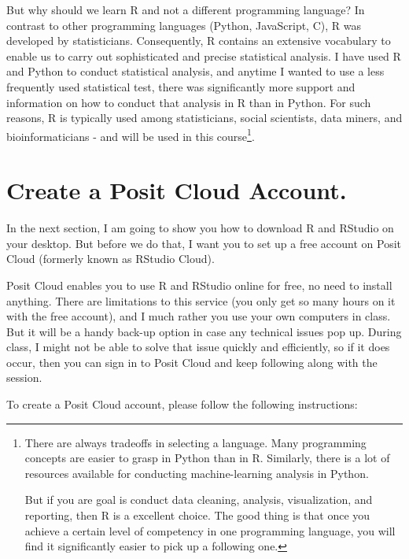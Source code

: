 \documentclass[
]{book}
\begin{document}
But why should we learn R and not a different programming language? In contrast to other programming languages (Python, JavaScript, C), R was developed by statisticians. Consequently, R contains an extensive vocabulary to enable us to carry out sophisticated and precise statistical analysis. I have used R and Python to conduct statistical analysis, and anytime I wanted to use a less frequently used statistical test, there was significantly more support and information on how to conduct that analysis in R than in Python. For such reasons, R is typically used among statisticians, social scientists, data miners, and bioinformaticians - and will be used in this course\footnote{There are always tradeoffs in selecting a language. Many programming concepts are easier to grasp in Python than in R. Similarly, there is a lot of resources available for conducting machine-learning analysis in Python.

  But if you are goal is conduct data cleaning, analysis, visualization, and reporting, then R is a excellent choice. The good thing is that once you achieve a certain level of competency in one programming language, you will find it significantly easier to pick up a following one.}.

\hypertarget{create-a-posit-cloud-account.}{%
\section{Create a Posit Cloud Account.}\label{create-a-posit-cloud-account.}}

In the next section, I am going to show you how to download R and RStudio on your desktop. But before we do that, I want you to set up a free account on Posit Cloud (formerly known as RStudio Cloud).

Posit Cloud enables you to use R and RStudio online for free, no need to install anything. There are limitations to this service (you only get so many hours on it with the free account), and I much rather you use your own computers in class. But it will be a handy back-up option in case any technical issues pop up. During class, I might not be able to solve that issue quickly and efficiently, so if it does occur, then you can sign in to Posit Cloud and keep following along with the session.

To create a Posit Cloud account, please follow the following instructions:
\end{document}
